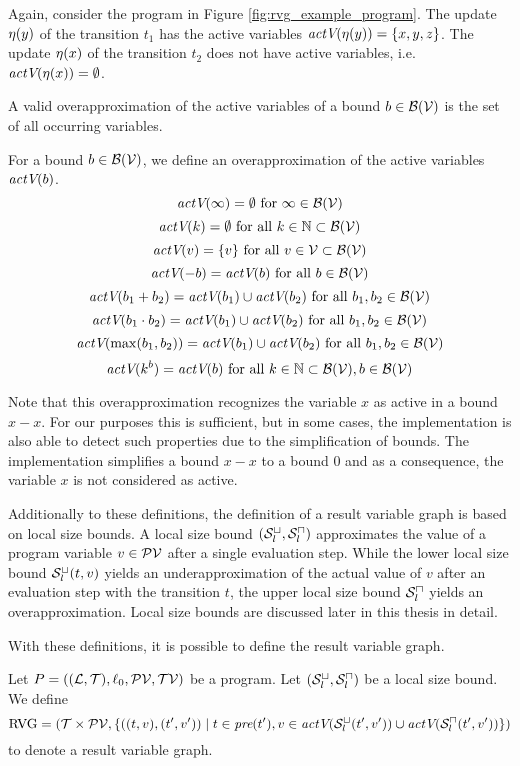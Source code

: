 Again, consider the program in Figure \ref{fig:rvg_example_program}.
The update $\eta(y)$ of the transition $t_1$ has the active variables $\emph{actV}(\eta(y)) = \lbrace x,y,z \rbrace$.
The update $\eta(x)$ of the transition $t_2$ does not have active variables, i.e. $\emph{actV}(\eta(x)) = \emptyset$.

A valid overapproximation of the active variables of a bound $b \in \mathcal{B}(\mathcal{V})$ is the set of all occurring variables.
\begin{definition}
  For a bound $b \in \mathcal{B}(\mathcal{V})$, we define an overapproximation of the active variables $\emph{actV}(b)$.
  \[ \emph{actV}(\infty) = \emptyset \text{ for } \infty \in \mathcal{B}(\mathcal{V}) \]
  \[ \emph{actV}(k) = \emptyset \text{ for all } k \in \mathbb{N} \subset \mathcal{B}(\mathcal{V}) \] 
  \[ \emph{actV}(v) = \lbrace v \rbrace \text{ for all } v \in \mathcal{V} \subset \mathcal{B}(\mathcal{V}) \] 
  \[ \emph{actV}(-b) = \emph{actV}(b) \text{ for all } b \in \mathcal{B}(\mathcal{V}) \] 
  \[ \emph{actV}(b_1 + b_2) = \emph{actV}(b_1) \cup \emph{actV}(b_2) \text{ for all } b_1, b_2 \in \mathcal{B}(\mathcal{V}) \] 
  \[ \emph{actV}(b_1 \cdot b_2) = \emph{actV}(b_1) \cup \emph{actV}(b_2) \text{ for all } b_1, b_2 \in \mathcal{B}(\mathcal{V}) \] 
  \[ \emph{actV}(\max(b_1, b_2)) = \emph{actV}(b_1) \cup \emph{actV}(b_2) \text{ for all } b_1, b_2 \in \mathcal{B}(\mathcal{V}) \]
  \[ \emph{actV}(k^b) = \emph{actV}(b) \text{ for all } k \in \mathbb{N} \subset \mathcal{B}(\mathcal{V}), b \in \mathcal{B}(\mathcal{V}) \]  
\end{definition}

Note that this overapproximation recognizes the variable $x$ as active in a bound $x - x$.
For our purposes this is sufficient, but in some cases, the implementation is also able to detect such properties due to the simplification of bounds.
The implementation simplifies a bound $x - x$ to a bound $0$ and as a consequence, the variable $x$ is not considered as active.

Additionally to these definitions, the definition of a result variable graph is based on local size bounds.
A local size bound ${({\mathcal{S}^\sqcup_l}, {\mathcal{S}^\sqcap_l})}$ approximates the value of a program variable $v \in \mathcal{PV}$ after a single evaluation step.
While the lower local size bound ${\mathcal{S}^\sqcup_l}(t,v)$ yields an underapproximation of the actual value of $v$ after an evaluation step with the transition $t$, the upper local size bound ${\mathcal{S}^\sqcap_l}$ yields an overapproximation.
Local size bounds are discussed later in this thesis in detail.

With these definitions, it is possible to define the result variable graph.

\begin{definition}
  Let $P = ((\mathcal{L}, \mathcal{T}), \ell_0, \mathcal{PV}, \mathcal{TV})$ be a program.
  Let ${({\mathcal{S}^\sqcup_l}, {\mathcal{S}^\sqcap_l})}$ be a local size bound.
  We define 
  \[ \text{RVG} = (\mathcal{T} \times \mathcal{PV}, \lbrace ((t, v), (t', v')) \mid t \in \emph{pre}(t'), v \in \emph{actV}({\mathcal{S}^\sqcup_l}(t',v')) \cup \emph{actV}({\mathcal{S}^\sqcap_l}(t',v')) \rbrace) \]
  to denote a result variable graph.
\end{definition}

